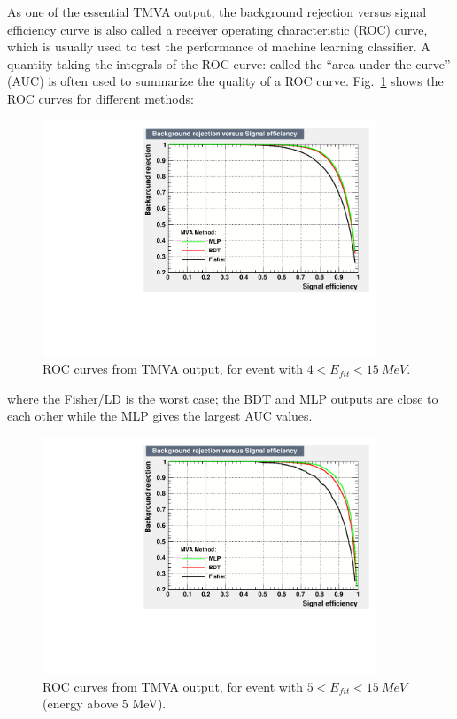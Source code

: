 As one of the essential TMVA output, the background rejection versus signal efficiency curve is also called a receiver operating characteristic (ROC) curve, which is usually used to test the performance of machine learning classifier. A quantity taking the integrals of the ROC curve: called the ``area under the curve'' (AUC) is often used to summarize the quality of a ROC curve\cite{murphy2012machine}.  Fig.~\ref{allE_roc} shows the ROC curves for different methods:
\begin{figure}[!htb]
	\centering
	\includegraphics[width=10cm]{ROC_E4to15.pdf}
	\caption{ROC curves from TMVA output, for event with $4<E_{fit}<15~MeV$.}
	\label{allE_roc}
\end{figure}
where the Fisher/LD is the worst case; the BDT and MLP outputs are close to each other while the MLP gives the largest AUC values.

\begin{figure}[!htb]
	\centering
	\includegraphics[width=10cm]{ROC_E5to15.pdf}
	\caption{ROC curves from TMVA output, for event with $5<E_{fit}<15~MeV$ (energy above 5 MeV).}
	\label{E5to15_roc}
\end{figure}

